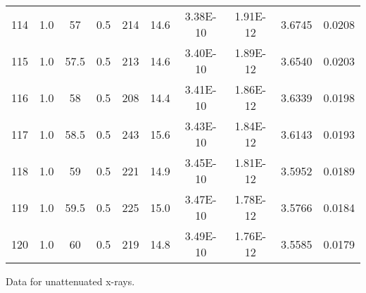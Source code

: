 \begin{maintable}[ht]
\begin{tabular}{cccccccccc}
114         & 1.0   & 57         & 0.5           & 214     & 14.6       & 3.38E-10    & 1.91E-12       & 3.6745    & 0.0208       \\
115         & 1.0   & 57.5       & 0.5           & 213     & 14.6       & 3.40E-10    & 1.89E-12       & 3.6540    & 0.0203       \\
116         & 1.0   & 58         & 0.5           & 208     & 14.4       & 3.41E-10    & 1.86E-12       & 3.6339    & 0.0198       \\
117         & 1.0   & 58.5       & 0.5           & 243     & 15.6       & 3.43E-10    & 1.84E-12       & 3.6143    & 0.0193       \\
118         & 1.0   & 59         & 0.5           & 221     & 14.9       & 3.45E-10    & 1.81E-12       & 3.5952    & 0.0189       \\
119         & 1.0   & 59.5       & 0.5           & 225     & 15.0       & 3.47E-10    & 1.78E-12       & 3.5766    & 0.0184       \\
120         & 1.0   & 60         & 0.5           & 219     & 14.8       & 3.49E-10    & 1.76E-12       & 3.5585    & 0.0179      
\end{tabular}
\caption{Data for unattenuated x-rays.}
\label{tab:xrcg3}
\end{maintable}




